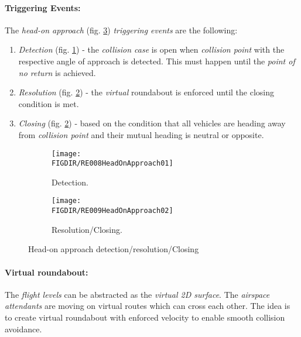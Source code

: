 \paragraph{Triggering Events:} The \emph{head-on approach} (fig. \ref{fig:HeadOnApproachTheoretical}) \emph{triggering events} are the following:
\begin{enumerate}
    \item \emph{Detection} (fig. \ref{fig:HeadOnApproachTheoreticalDetection}) - the \emph{collision case} is open when \emph{collision point} with the respective angle of approach is detected. This must happen until the \emph{point of no return} is achieved. 
    
    \item \emph{Resolution} (fig. \ref{fig:HeadOnApproachTheoreticalResolution}) - the \emph{virtual} roundabout is enforced until the closing condition is met. 
    
    \item \emph{Closing} (fig. \ref{fig:HeadOnApproachTheoreticalResolution}) - based on the condition that all vehicles are heading away from \emph{collision point} and their mutual heading is neutral or opposite.
\end{enumerate} 


\begin{figure}[H]
	\centering
    \begin{subfigure}{0.45\textwidth}
    	\centering
        \texttt{[image: \\FIGDIR/RE008HeadOnApproach01]} 
        \caption{Detection.}
        \label{fig:HeadOnApproachTheoreticalDetection}
    \end{subfigure}
    \begin{subfigure}{0.45\textwidth}
    	\centering
        \texttt{[image: \\FIGDIR/RE009HeadOnApproach02]} 
        \caption{Resolution/Closing.}
        \label{fig:HeadOnApproachTheoreticalResolution}
    \end{subfigure}
    \caption{Head-on approach detection/resolution/Closing}
    \label{fig:HeadOnApproachTheoretical}
\end{figure}

\paragraph{Virtual roundabout:} The \emph{flight levels} can be abstracted as the  \emph{virtual 2D surface}. The \emph{airspace attendants} are moving on virtual routes which can cross each other. The idea is to create virtual roundabout with enforced velocity to enable smooth collision avoidance.

